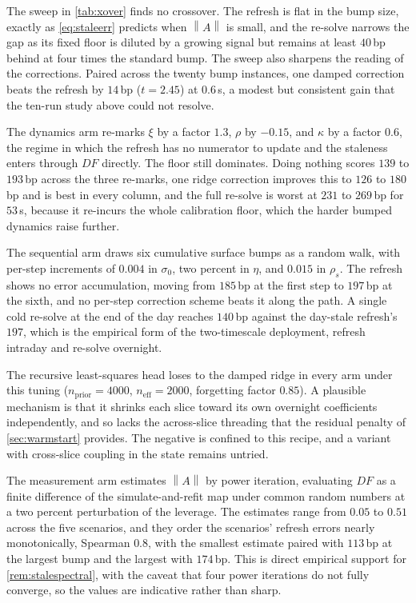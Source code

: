 \documentclass[11pt,a4paper]{article}
\theoremstyle{plain}
\theoremstyle{definition}
\theoremstyle{definition}
\newcommand{\norm}[1]{\left\lVert #1 \right\rVert}
\begin{document}
The sweep in \cref{tab:xover} finds no crossover. The refresh is flat in the bump size, exactly as \cref{eq:staleerr} predicts when $\norm{A}$ is small, and the re-solve narrows the gap as its fixed floor is diluted by a growing signal but remains at least $40$\,bp behind at four times the standard bump. The sweep also sharpens the reading of the corrections. Paired across the twenty bump instances, one damped correction beats the refresh by $14$\,bp ($t = 2.45$) at $0.6$\,s, a modest but consistent gain that the ten-run study above could not resolve.

The dynamics arm re-marks $\xi$ by a factor $1.3$, $\rho$ by $-0.15$, and $\kappa$ by a factor $0.6$, the regime in which the refresh has no numerator to update and the staleness enters through $DF$ directly. The floor still dominates. Doing nothing scores $139$ to $193$\,bp across the three re-marks, one ridge correction improves this to $126$ to $180$\,bp and is best in every column, and the full re-solve is worst at $231$ to $269$\,bp for $53$\,s, because it re-incurs the whole calibration floor, which the harder bumped dynamics raise further.

The sequential arm draws six cumulative surface bumps as a random walk, with per-step increments of $0.004$ in $\sigma_0$, two percent in $\eta$, and $0.015$ in $\rho_s$. The refresh shows no error accumulation, moving from $185$\,bp at the first step to $197$\,bp at the sixth, and no per-step correction scheme beats it along the path. A single cold re-solve at the end of the day reaches $140$\,bp against the day-stale refresh's $197$, which is the empirical form of the two-timescale deployment, refresh intraday and re-solve overnight.

The recursive least-squares head loses to the damped ridge in every arm under this tuning ($n_{\mathrm{prior}} = 4000$, $n_{\mathrm{eff}} = 2000$, forgetting factor $0.85$). A plausible mechanism is that it shrinks each slice toward its own overnight coefficients independently, and so lacks the across-slice threading that the residual penalty of \cref{sec:warmstart} provides. The negative is confined to this recipe, and a variant with cross-slice coupling in the state remains untried.

The measurement arm estimates $\norm{A}$ by power iteration, evaluating $DF$ as a finite difference of the simulate-and-refit map under common random numbers at a two percent perturbation of the leverage. The estimates range from $0.05$ to $0.51$ across the five scenarios, and they order the scenarios' refresh errors nearly monotonically, Spearman $0.8$, with the smallest estimate paired with $113$\,bp at the largest bump and the largest with $174$\,bp. This is direct empirical support for \cref{rem:stalespectral}, with the caveat that four power iterations do not fully converge, so the values are indicative rather than sharp.
\end{document}
